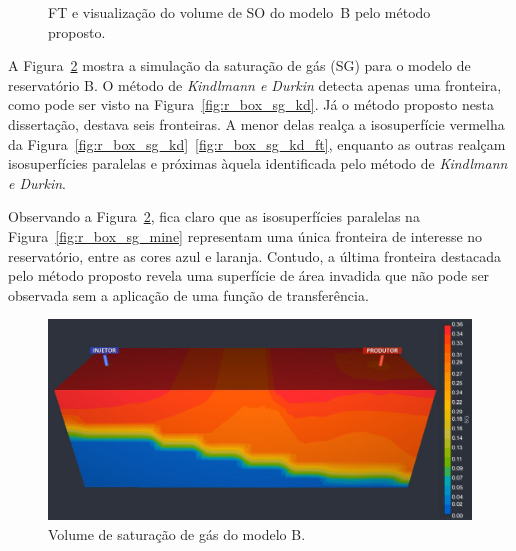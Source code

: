 \begin{figure}[h]
	\centering
	\caption{FT e visualização do volume de SO do modelo~B pelo método proposto.}
	\label{fig:r_box_so_mine}
\end{figure}

	A Figura~\ref{fig:r_box_sg_slice} mostra a simulação da saturação de gás (SG) para o modelo de reservatório B. O método de \textit{Kindlmann e Durkin} detecta apenas uma fronteira, como pode ser visto na Figura~\ref{fig:r_box_sg_kd}. Já o método proposto nesta dissertação, destava seis fronteiras. A menor delas realça a isosuperfície vermelha da Figura~\ref{fig:r_box_sg_kd}~\ref{fig:r_box_sg_kd_ft}, enquanto as outras realçam isosuperfícies paralelas e próximas àquela identificada pelo método de \textit{Kindlmann e Durkin}.
	
	Observando a Figura~\ref{fig:r_box_sg_slice}, fica claro que as isosuperfícies paralelas na Figura~\ref{fig:r_box_sg_mine} representam uma única fronteira de interesse no reservatório, entre as cores azul e laranja. Contudo, a última fronteira destacada pelo método proposto revela uma superfície de área invadida que não pode ser observada sem a aplicação de uma função de transferência.\\
	
\begin{figure}[h]
	\centering
	\includegraphics[width=1\textwidth]{images/r_box_sg_slice}
	\caption{Volume de saturação de gás do modelo B.}
	\label{fig:r_box_sg_slice}
\end{figure}

